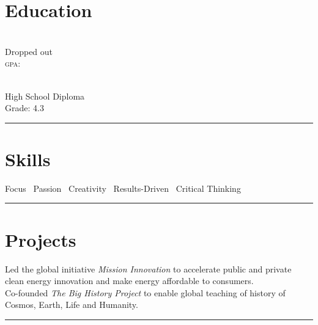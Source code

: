 \documentclass[a4paper]{article}
\begin{document}
\section* {Education}

\\
Dropped out\\
\textsc{gpa}: 


\noindent
{}\\
High School Diploma\\
Grade: 4.3

\vspace{4mm} \hrule \vspace{3mm}



\section* {Skills}

Focus \textbullet\ Passion \textbullet\ Creativity \textbullet\ Results-Driven \textbullet\ Critical Thinking

\vspace{4mm} \hrule \vspace{3mm}



\section* {Projects}

Led the global initiative \emph{Mission Innovation} to accelerate public and private clean energy innovation and make energy affordable to consumers.\\[3mm]

Co-founded \emph{The Big History Project} to enable global teaching of history of Cosmos, Earth, Life and Humanity.\\[3mm]

\vspace{4mm} \hrule \vspace{3mm}


\end{document}
